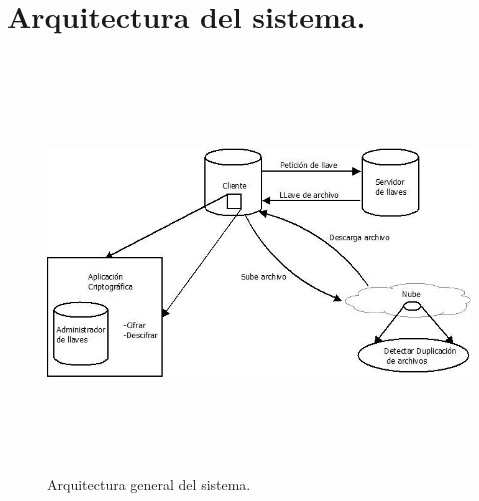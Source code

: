 

\section{Arquitectura del sistema. }

\begin{figure}[H]
\centering
	\includegraphics[width=16cm, height=11cm]{./images/Arqui.jpg}
	\caption{Arquitectura general del sistema.}

\end{figure}







